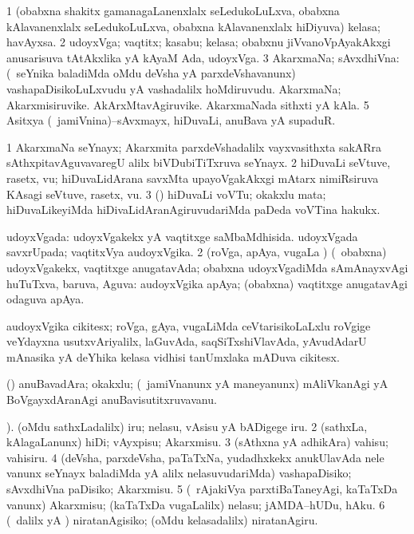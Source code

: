 \bentry
{}
\gl{\nA}
\bmng
\bnum
\num{1} (obabxna shakitx gamanagaLanenxlalx seLedukoLuLxva, obabxna kAlavanenxlalx seLedukoLuLxva, obabxna kAlavanenxlalx hiDiyuva) kelasa; havAyxsa. 
\num{2} udoyxVga; vaqtitx; kasabu; kelasa; obabxnu jiVvanoVpAyakAkxgi anusarisuva tAtAkxlika yA kAyaM Ada, udoyxVga. 
\num{3} AkarxmaNa; sAvxdhiVna: (\kanmu\ seYnika baladiMda oMdu deVsha yA parxdeVshavanunx) vashapaDisikoLuLxvudu yA vashadalilx hoMdiruvudu. 
\banum
{} AkarxmaNa; Akarxmisiruvike. 
 AkArxMtavAgiruvike. 
 AkarxmaNada sithxti yA kAla. 
\eanum
\numie
\num{5} Asitxya (\kanmu\ jamiVnina)--sAvxmayx, hiDuvaLi, anuBava yA supaduR. 
\enum
\emng

\noindent
\gl{\pagu}
\bmng
\bnum
\num{1}  AkarxmaNa seYnayx; Akarxmita parxdeVshadalilx vayxvasithxta sakARra sAthxpitavAguvavaregU alilx biVDubiTiTxruva seYnayx. 
\num{2}  hiDuvaLi seVtuve, rasetx, \mo vu; hiDuvaLidArana savxMta upayoVgakAkxgi mAtarx nimiRsiruva KAsagi seVtuve, rasetx, \mo vu. 
\num{3}  (\birx) hiDuvaLi voVTu; okakxlu mata; hiDuvaLikeyiMda hiDivaLidAranAgiruvudariMda paDeda voVTina hakukx. 
\enum
\emng
\eentry

\bentry
{}
\gl{\gu}
\bmng
\bnum
{} udoyxVgada: 
\banum
{} udoyxVgakekx yA vaqtitxge saMbaMdhisida. 
 udoyxVgada savxrUpada; vaqtitxVya audoyxVgika. 
\eanum
\numie
\num{2} (roVga, apAya, \mo vugaLa \vi) (\kanmu\ obabxna) udoyxVgakekx, vaqtitxge anugatavAda; obabxna udoyxVgadiMda sAmAnayxvAgi huTuTxva, baruva, Aguva:  audoyxVgika apAya; (obabxna) vaqtitxge anugatavAgi odaguva apAya. 
\enum
\emng
\eentry

\bentry
{}
\gl{\nA}
\bmng
audoyxVgika cikitesx; roVga, gAya, \mo vugaLiMda ceVtarisikoLaLxlu roVgige veYdayxna usutxvAriyalilx, laGuvAda, saqSiTxshiVlavAda, yAvudAdarU mAnasika yA deYhika kelasa vidhisi tanUmxlaka mADuva cikitesx. 
\emng
\eentry

\bentry
{}
\gl{\nA}
\bmng
(\birx) anuBavadAra; okakxlu; (\kanmu\ jamiVnanunx yA maneyanunx) mAliVkanAgi yA BoVgayxdAranAgi anuBavisutitxruvavanu. 
\emng
\eentry

\bentry
{}
\gl{\sakirx}
).\bmng
\bnum
{} (oMdu sathxLadalilx) 
\banum
{} iru; nelasu, 
 vAsisu yA bADigege iru. 
\eanum
\numie
\num{2} (sathxLa, kAlagaLanunx) hiDi; vAyxpisu; Akarxmisu. 
\num{3} (sAthxna yA adhikAra) vahisu; vahisiru. 
\num{4} (deVsha, parxdeVsha, paTaTxNa, yudadhxkekx anukUlavAda nele \mo vanunx seYnayx baladiMda yA alilx nelasuvudariMda) vashapaDisiko; sAvxdhiVna paDisiko; Akarxmisu. 
\num{5} (\kanmu\ rAjakiVya parxtiBaTaneyAgi, kaTaTxDa \mo vanunx) Akarxmisu; (kaTaTxDa \mo vugaLalilx) nelasu; jAMDA--hUDu, hAku. 
\num{6} (\sA\ \kaparx dalilx yA \AtAmx) niratanAgisiko; (oMdu kelasadalilx) niratanAgiru. 
\enum
\emng

